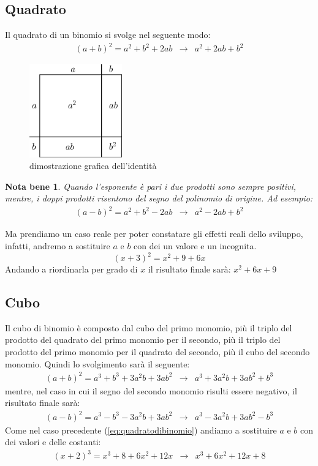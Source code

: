 \documentclass{article}
\newtheorem{notab}{Nota bene}
\begin{document}
\subsection{Quadrato}
\label{sec:binomiodi2}
Il quadrato di un binomio si svolge nel seguente modo:
\begin{eqnarray}
  \label{eq:quadratodibinomio}
  (a+b)^2=a^2+b^2+2ab & \to & a^2+2ab+b^2
\end{eqnarray}
\begin{figure}[th]
  \centering
  \includegraphics[width=4cm]{img/binomio.eps}
  \caption{dimostrazione grafica dell'identità}
  \label{fig:identità}
\end{figure}
\begin{notab}
  Quando l'esponente è pari i due prodotti sono sempre positivi, mentre, i doppi prodotti risentono del segno
  del polinomio di origine. Ad esempio:
  \begin{eqnarray}
    \label{eq:quadratodibinomioconsegnonegativo}
    (a-b)^2=a^2+b^2-2ab & \to & a^2-2ab+b^2
  \end{eqnarray}
\end{notab}
Ma prendiamo un caso reale per poter constatare gli effetti reali dello sviluppo, infatti, andremo a sostituire
$a$ e $b$ con dei un valore e un incognita.
\begin{equation*}
  (x+3)^2=x^2 + 9 + 6x
\end{equation*}
Andando a riordinarla per grado di $x$ il risultato finale sarà: $x^2+6x + 9$

\subsection{Cubo}
\label{sec:qudodibinomio}

Il cubo di binomio è composto dal cubo del primo monomio, più il triplo del prodotto del quadrato del primo
monomio per il secondo, più il triplo del prodotto del primo monomio per il quadrato del secondo, più il cubo
del secondo monomio. Quindi lo svolgimento sarà il seguente:
\begin{eqnarray}
  \label{eq:cubodibinomio}
  (a+b)^2=a^3+b^3+3a^2b+3ab^2 & \to & a^3+3a^2b+3ab^2+b^3
\end{eqnarray}
mentre, nel caso in cui il segno del secondo monomio risulti essere negativo, il risultato finale sarà:
\begin{eqnarray}
  \label{eq:cubodibinomioneg}
  (a-b)^2=a^3-b^3-3a^2b+3ab^2 & \to & a^3-3a^2b+3ab^2-b^3
\end{eqnarray}
Come nel caso precedente (\ref{eq:quadratodibinomio}) andiamo a sostituire $a$ e $b$ con dei valori e delle
costanti:
\begin{eqnarray*}
  (x+2)^3=x^3+8+6x^2+12x & \to  & x^3+6x^2+12x+8
\end{eqnarray*}
\end{document}
